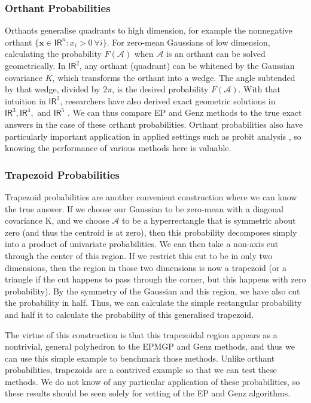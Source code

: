 \documentclass[twoside,11pt]{article}
\def\x{{\mathbf x}}
\def\regionA{\mathcal{A}}
\newcommand{\reals}{\mathsf{I\!R}}
\begin{document}
\subsubsection{Orthant Probabilities} 

Orthants generalise quadrants to high dimension, for example the nonnegative orthant $\{ \x \in \reals^n : x_i > 0~ \forall i \}$.   For zero-mean Gaussians of low dimension, calculating the probability $F(\regionA)$ when $\regionA$ is an orthant can be solved geometrically.  In $\reals^2$, any orthant (quadrant) can be whitened by the Gaussian covariance $K$, which transforms the orthant into a wedge.  The angle subtended by that wedge, divided by $2\pi$, is the desired probability $F(\regionA)$.  With that intuition in $\reals^2$, researchers have also derived exact geometric solutions in $\reals^3, \reals^4,$ and $\reals^5$ \cite[]{genzBook, sinnKeller2010}.  We can thus compare EP and Genz methods to the true exact answers in the case of these orthant probabilities.  Orthant probabilities also have particularly important application in applied settings such as probit analysis \citep{AshfordSowden1970,SicklesTabuman1986,Gibbons1996}, so knowing the performance of various methods here is valuable.

\subsubsection{Trapezoid Probabilities}

Trapezoid probabilities are another convenient construction where we can know the true answer.   If we choose our Gaussian to be zero-mean with a diagonal covariance K, and we choose $\regionA$ to be a hyperrectangle that is symmetric about zero (and thus the centroid is at zero), then this probability decomposes simply into a product of univariate probabilities.  We can then take a non-axis cut through the center of this region.   If we restrict this cut to be in only two dimensions, then the region in those two dimensions is now a trapezoid (or a triangle if the cut happens to pass through the corner, but this happens with zero probability).   By the symmetry of the Gaussian and this region, we have also cut the probability in half.  Thus, we can calculate the simple rectangular probability and half it to calculate the probability of this generalised trapezoid.   

The virtue of this construction is that this trapezoidal region appears as a nontrivial, general polyhedron to the EPMGP and Genz methods, and thus we can use this simple example to benchmark those methods.  Unlike orthant probabilities, trapezoids are a contrived example so that we can test these methods.  We do not know of any particular application of these probabilities, so these results should be seen solely for vetting of the EP and Genz algorithms.
\end{document}
